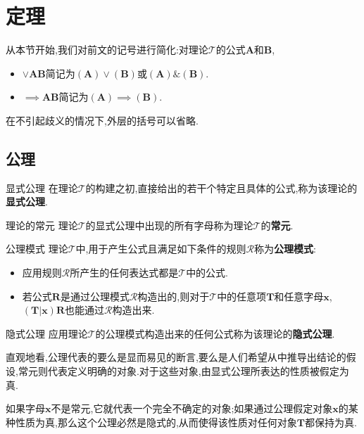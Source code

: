 \chapter{定理}

从本节开始,我们对前文的记号进行简化:对理论$\mathcal{T}$的公式$\boldsymbol{A}$和$\boldsymbol{B}$,
\begin{itemize}
	\item $\vee\boldsymbol{A}\boldsymbol{B}$简记为$\left(\boldsymbol{A}\right)\vee\left(\boldsymbol{B}\right)$或$\left(\boldsymbol{A}\right)\&\left(\boldsymbol{B}\right)$.
	\item $\implies\boldsymbol{A}\boldsymbol{B}$简记为$\left(\boldsymbol{A}\right)\implies\left(\boldsymbol{B}\right)$.
\end{itemize}
在不引起歧义的情况下,外层的括号可以省略.


\section{公理}

\begin{definition}{显式公理}{}
	在理论$\mathcal{T}$的构建之初,直接给出的若干个特定且具体的公式,称为该理论的\textbf{显式公理}.
\end{definition}

\begin{definition}{理论的常元}{}
	理论$\mathcal{T}$的显式公理中出现的所有字母称为理论$\mathcal{T}$的\textbf{常元}.
\end{definition}

\begin{definition}{公理模式}{}
	理论$\mathcal{T}$中,用于产生公式且满足如下条件的规则$\mathcal{R}$称为\textbf{公理模式}:
	\begin{itemize}
		\item 应用规则$\mathcal{R}$所产生的任何表达式都是$\mathcal{T}$中的公式.
		\item 若公式$\boldsymbol{R}$是通过公理模式$\mathcal{R}$构造出的,则对于$\mathcal{T}$中的任意项$\boldsymbol{T}$和任意字母$\boldsymbol{x}$,$\left(\boldsymbol{T}|\boldsymbol{x}\right)\boldsymbol{R}$也能通过$\mathcal{R}$构造出来.
	\end{itemize}
\end{definition}

\begin{definition}{隐式公理}{}
	应用理论$\mathcal{T}$的公理模式构造出来的任何公式称为该理论的\textbf{隐式公理}.
\end{definition}

\begin{remark}{}{}
	直观地看,公理代表的要么是显而易见的断言,要么是人们希望从中推导出结论的假设,常元则代表定义明确的对象.对于这些对象,由显式公理所表达的性质被假定为真.
	
	如果字母$\boldsymbol{x}$不是常元,它就代表一个完全不确定的对象;如果通过公理假定对象$\boldsymbol{x}$的某种性质为真,那么这个公理必然是隐式的,从而使得该性质对任何对象$\boldsymbol{T}$都保持为真.
\end{remark}

 